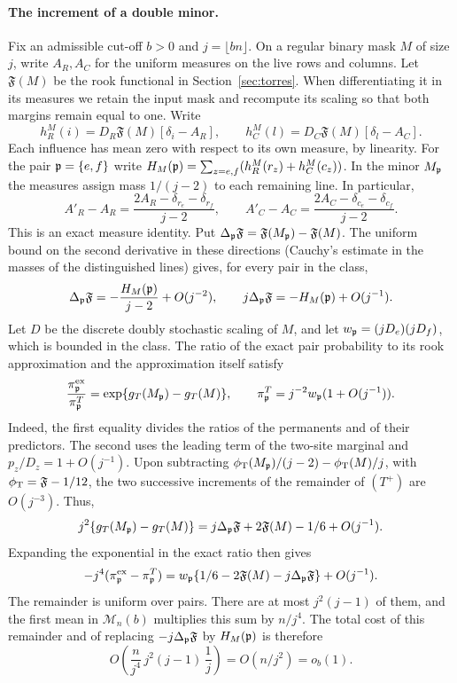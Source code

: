 \paragraph{The increment of a double minor.} Fix an admissible cut-off \(b>0\) and \(j=\lfloor
bn\rfloor\). On a regular binary mask \(M\) of size \(j\), write \(A_R,A_C\) for the uniform measures on
the live rows and columns. Let \(\mathfrak F(M)\) be the rook functional in Section~\ref{sec:torres}.
When differentiating it in its measures we retain the input mask and recompute its scaling so that both
margins remain equal to one. Write
\[
 h_R^M(i)=D_R\mathfrak F(M)[\delta_i-A_R],\qquad
 h_C^M(l)=D_C\mathfrak F(M)[\delta_l-A_C].
\]
Each influence has mean zero with respect to its own measure, by linearity. For the pair
\(\mathfrak p=\{e,f\}\) write \(H_M(\mathfrak p)=\sum_{z=e,f}(h_R^M(r_z)+h_C^M(c_z))\). In the minor
\(M_{\mathfrak p}\) the measures assign mass \(1/(j-2)\) to each remaining line. In particular,
\[
 A'_R-A_R=\frac{2A_R-\delta_{r_e}-\delta_{r_f}}{j-2},\qquad
 A'_C-A_C=\frac{2A_C-\delta_{c_e}-\delta_{c_f}}{j-2}.
\]
This is an exact measure identity. Put \(\Delta_{\mathfrak p}\mathfrak F=\mathfrak F(M_{\mathfrak p})-\mathfrak
F(M)\). The uniform bound on the second derivative in these directions (Cauchy's estimate in the masses
of the distinguished lines) gives, for every pair in the class,
\[
 \Delta_{\mathfrak p}\mathfrak F=-\frac{H_M(\mathfrak p)}{j-2}+O(j^{-2}),\qquad
 j\Delta_{\mathfrak p}\mathfrak F=-H_M(\mathfrak p)+O(j^{-1}).
\]
Let \(D\) be the discrete doubly stochastic scaling of \(M\), and let \(w_{\mathfrak p}=(jD_e)(jD_f)\), which
is bounded in the class. The ratio of the exact pair probability to its rook approximation and the
approximation itself satisfy
\[
 \frac{\pi_{\mathfrak p}^{\rm ex}}{\pi_{\mathfrak p}^T}=\exp\{g_T(M_{\mathfrak p})-g_T(M)\},\qquad
 \pi_{\mathfrak p}^T=j^{-2}w_{\mathfrak p}(1+O(j^{-1})).
\]
Indeed, the first equality divides the ratios of the permanents and of their predictors. The second uses
the leading term of the two-site marginal and \(p_z/D_z=1+O(j^{-1})\). Upon subtracting
\(\phi_{\mathrm T}(M_{\mathfrak p})/(j-2)-\phi_{\mathrm T}(M)/j\), with \(\phi_{\mathrm T}=\mathfrak F-1/12\), the two successive
increments of the remainder of \((T^+)\) are \(O(j^{-3})\). Thus,
\[
 j^2\{g_T(M_{\mathfrak p})-g_T(M)\}
 =j\Delta_{\mathfrak p}\mathfrak F+2\mathfrak F(M)-1/6+O(j^{-1}).
\]
Expanding the exponential in the exact ratio then gives
\begin{equation}\label{eq:pt-par-fisico}
 -j^4(\pi_{\mathfrak p}^{\rm ex}-\pi_{\mathfrak p}^T)
 =w_{\mathfrak p}\{1/6-2\mathfrak F(M)-j\Delta_{\mathfrak p}\mathfrak F\}+O(j^{-1}).
\end{equation}
The remainder is uniform over pairs. There are at most \(j^2(j-1)\) of them, and the first mean in
\(\mathcal M_n(b)\) multiplies this sum by \(n/j^4\). The total cost of this remainder and of replacing
\(-j\Delta_{\mathfrak p}\mathfrak F\) by \(H_M(\mathfrak p)\) is therefore
\[
 O\!\left(\frac{n}{j^4}\,j^2(j-1)\,\frac1j\right)
 =O(n/j^2)=o_b(1).
\]
